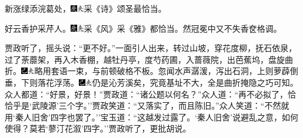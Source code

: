 新涨绿添浣葛处，{\includegraphics[width=3mm]{../Images/00004}\includegraphics[width=3mm]{../Images/00012}\footnotesize \kaishu 采《诗》颂圣最恰当。}

好云香护采芹人。{\includegraphics[width=3mm]{../Images/00004}\includegraphics[width=3mm]{../Images/00012}\footnotesize \kaishu 采《风》采《雅》都恰当。然冠冕中又不失香奁格调。}

贾政听了，摇头说：``更不好。''一面引人出来，转过山坡，穿花度柳，抚石依泉，过了荼蘼架，再入木香棚，越牡丹亭，度芍药圃，入蔷薇院，出芭蕉坞，盘旋曲折。{\includegraphics[width=3mm]{../Images/00003}\includegraphics[width=3mm]{../Images/00012}\footnotesize \kaishu 略用套语一束，与前顿破格不板。}忽闻水声潺湲，泻出石洞，上则萝薜倒垂，下则落花浮荡。{\includegraphics[width=3mm]{../Images/00003}\includegraphics[width=3mm]{../Images/00012}\footnotesize \kaishu 仍是沁芳溪矣，究竟基址不大，全是曲折掩隐之巧可知。}众人都道：``好景，好景！''贾政道：``诸公题以何名？''众人道：``再不必拟了，恰恰乎是`武陵源'三个字。''贾政笑道：``又落实了，而且陈旧。''众人笑道：``不然就用`秦人旧舍'四字也罢了。''宝玉道：``这越发过露了。`秦人旧舍'说避乱之意，如何使得？莫若`蓼汀花溆'四字。''贾政听了，更批胡说。

